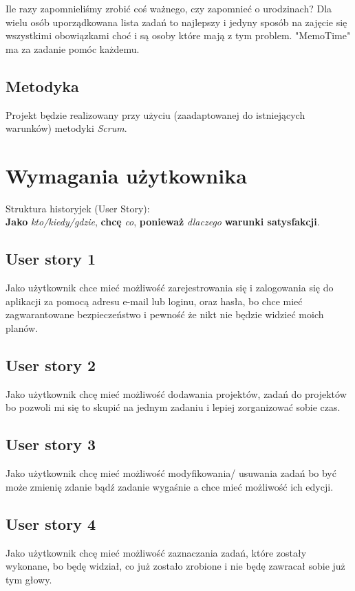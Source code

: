\documentclass[a4paper]{article}
\begin{document}
Ile razy zapomnieliśmy zrobić coś ważnego, czy zapomnieć o urodzinach? Dla wielu osób uporządkowana lista zadań to najlepszy i jedyny sposób na zajęcie się wszystkimi obowiązkami choć i są osoby które mają z tym problem. "MemoTime" ma za zadanie pomóc każdemu. 

\subsection{Metodyka}
\label{subsec:Metodyka}

Projekt będzie realizowany przy użyciu (zaadaptowanej do istniejących warunków) metodyki {\em Scrum}. 

\section{Wymagania użytkownika}
\label{sec:WymaganiaUzytkownika}
Struktura historyjek (User Story):\\
\textbf{Jako} \textit{kto/kiedy/gdzie}, \textbf{chcę} \textit{co}, \textbf{ponieważ}  \textit{dlaczego} \textbf{warunki satysfakcji}.

\subsection{User story 1}
\label{subsec:UserStory1}
Jako użytkownik chce mieć możliwość zarejestrowania się i zalogowania się do aplikacji za pomocą adresu e-mail lub loginu, oraz hasła, bo chce mieć zagwarantowane bezpieczeństwo i pewność że nikt nie będzie widzieć moich planów.

\subsection{User story 2}
\label{subsec:UserStory2}
Jako użytkownik chcę mieć możliwość dodawania projektów, zadań do projektów bo pozwoli mi się to skupić na jednym zadaniu i lepiej zorganizować sobie czas.

\subsection{User story 3}
\label{subsec:UserStory3}
Jako użytkownik chcę mieć możliwość modyfikowania/ usuwania zadań bo być może zmienię zdanie bądź zadanie wygaśnie a chce mieć możliwość ich edycji.

\subsection{User story 4}
\label{subsec:UserStory4}
Jako użytkownik chcę mieć możliwość zaznaczania zadań, które zostały wykonane, bo będę widział, co już zostało zrobione i nie będę zawracał sobie już tym głowy.
\end{document}
